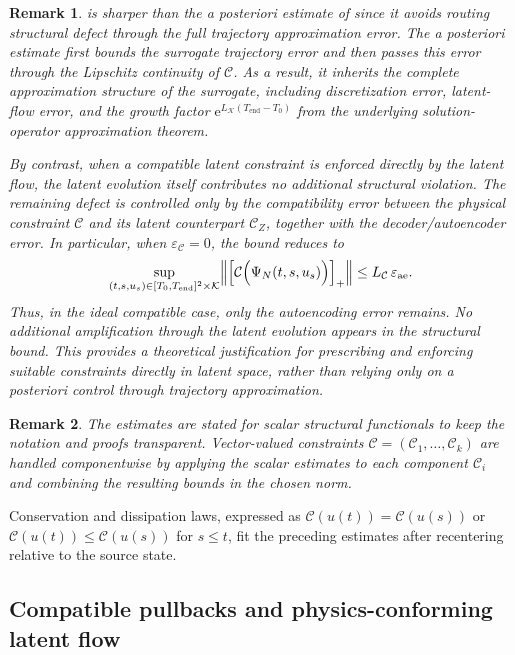 \documentclass[a4paper,fleqn]{cas-sc}
\theoremstyle{thmstyleone}%
\theoremstyle{thmstyletwo}%
\newtheorem{remark}{Remark}%
\theoremstyle{thmstylethree}%
\begin{document}
\begin{remark}\label{rem:comparison}
 is sharper than the a posteriori estimate of  since it avoids routing structural defect through the full trajectory approximation error. The a posteriori estimate first bounds the surrogate trajectory error and then passes this error through the Lipschitz continuity of $\mathcal C$. As a result, it inherits the complete approximation structure of the surrogate, including discretization error, latent-flow error, and the growth factor $\mathrm e^{L_{\mathcal K}(T_{\mathrm{end}}-T_0)}$ from the underlying solution-operator approximation theorem.

By contrast, when a compatible latent constraint is enforced directly by the latent flow, the latent evolution itself contributes no additional structural violation. The remaining defect is controlled only by the compatibility error between the physical constraint $\mathcal C$ and its latent counterpart $\mathcal C_Z$, together with the decoder/autoencoder error. In particular, when $\varepsilon_{\mathcal C}=0$, the bound reduces to
\[
\sup_{(t,s,u_s)\in[T_0,T_{\mathrm{end}}]^2\times \mathcal K}
\Bigl\|\Bigl[
\mathcal{C}\Bigl(
\Psi_{N}(t,s,u_s)
\Bigr)
\Bigr]_+\Bigr\|
\le
L_{\mathcal{C}}\,\varepsilon_{\mathrm{ae}}.
\]
Thus, in the ideal compatible case, only the autoencoding error remains. No additional amplification through the latent evolution appears in the structural bound. This provides a theoretical justification for prescribing and enforcing suitable constraints directly in latent space, rather than relying only on a posteriori control through trajectory approximation.
\end{remark}

\begin{remark}
The estimates are stated for scalar structural functionals to keep the notation and proofs transparent. Vector-valued constraints $\mathcal C=(\mathcal C_1,\ldots,\mathcal C_k)$ are handled componentwise by applying the scalar estimates to each component $\mathcal C_i$ and combining the resulting bounds in the chosen norm.
\end{remark}

Conservation and dissipation laws, expressed as $\mathcal C(u(t))=\mathcal C(u(s))$ or $\mathcal C(u(t))\leq \mathcal C(u(s))$ for $s\leq t$, fit the preceding estimates after recentering relative to the source state.

\subsection{Compatible pullbacks and physics-conforming latent flow} \label{sec:pclflow}
\end{document}
